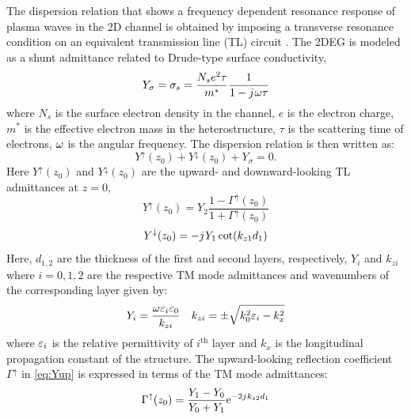 \documentclass[11pt]{article}
\begin{document}
The dispersion relation that shows a frequency dependent resonance response of plasma waves in the 2D channel is obtained by imposing a transverse resonance condition on an equivalent transmission line (TL) circuit \cite{Kastner_1988,Michalski2005}. The 2DEG is modeled as a shunt admittance related to Drude-type surface conductivity,
%
\begin{equation}
  Y_{\sigma} = \sigma_s = \frac{N_s e^2 \tau}{m^{\ast}}\frac{1}{1 - j\mkern1mu \omega \tau}
  \label{eq:Y2deg}
\end{equation}
%
where $N_s$ is the surface electron density in the channel, $e$ is the electron charge, $m^{\ast}$ is the effective electron mass in the heterostructure, $\tau$ is the scattering time of electrons, $\omega$ is the angular frequency. The dispersion relation is then written as:
%
\begin{equation}
  Y^{\uparrow}(z_0) + Y^{\downarrow}(z_0) + Y_{\sigma} = 0.
  \label{eq:dispersion}
\end{equation}
%
Here $Y^{\uparrow}(z_0)$ and $Y^{\downarrow}(z_0)$ are the upward- and downward-looking TL admittances at $z = 0$,
%
\begin{equation}
  Y^{\uparrow}(z_0) = Y_2 \frac{1 - \Gamma^{\uparrow}(z_0)}{1 + \Gamma^{\uparrow}(z_0)}
  \label{eq:Yup}
\end{equation}
%
\begin{equation}
  Y^{\downarrow}(z_0) = -j\mkern1mu Y_1 \cot (k_{z1} d_1)
  \label{eq:Ydown}
\end{equation}
%
Here, $d_{1,2}$ are the thickness of the first and second layers,
respectively,  $Y_{i}$ and $k_{zi}$ where $i = 0,1,2$ are the respective TM mode admittances and wavenumbers of the corresponding layer given by:
%
\begin{align}
  & Y_i = \frac{\omega \varepsilon_i \varepsilon_0}{k_{zi}}&&k_{zi} = \pm \sqrt{k_0^2 \varepsilon_i - k_x^2} \\
  \label{eq:Yandk}
\end{align}
%
where $\varepsilon_i$ is the relative permittivity of $i^{\text{th}}$ layer and $k_x$ is the longitudinal propagation constant of the structure. The upward-looking reflection coefficient $\Gamma^{\uparrow}$ in \eqref{eq:Yup} is expressed in terms of the TM mode admittances:
%
\begin{equation}
  \Gamma^{\uparrow}(z_0) = \frac{Y_1 - Y_0}{Y_0 + Y_1} \mathrm{e}^{-2j\mkern1mu k_{z2}d_1}
  \label{eq:Gamma}
\end{equation}
%
\end{document}
